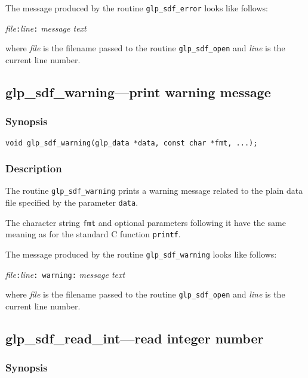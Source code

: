 The message produced by the routine \verb|glp_sdf_error| looks like
follows:

\medskip

{\it file}{\tt :}{\it line}{\tt :} {\it message text}

\medskip

\noindent
where {\it file} is the filename passed to the routine
\verb|glp_sdf_open| and {\it line} is the current line number.

\newpage

\subsection{glp\_sdf\_warning---print warning message}

\subsubsection*{Synopsis}

\begin{verbatim}
void glp_sdf_warning(glp_data *data, const char *fmt, ...);
\end{verbatim}

\subsubsection*{Description}

The routine \verb|glp_sdf_warning| prints a warning message related to
the plain data file specified by the parameter \verb|data|.

The character string \verb|fmt| and optional parameters following it
have the same meaning as for the standard C function \verb|printf|.

The message produced by the routine \verb|glp_sdf_warning| looks like
follows:

\medskip

{\it file}{\tt :}{\it line}\verb|: warning:| {\it message text}

\medskip

\noindent
where {\it file} is the filename passed to the routine
\verb|glp_sdf_open| and {\it line} is the current line number.

\subsection{glp\_sdf\_read\_int---read integer number}

\subsubsection*{Synopsis}

